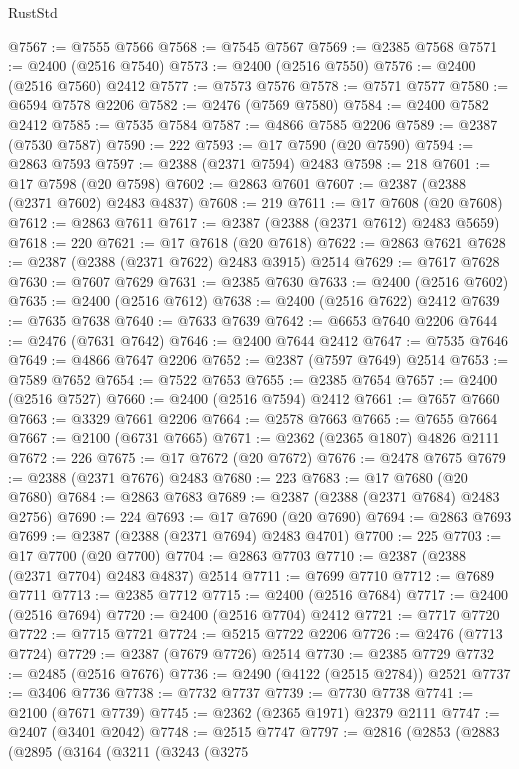 \begin{lexlean}{RustStd}
\begin{coremodule}
@7567 := @7555 @7566
@7568 := @7545 @7567
@7569 := @2385 @7568
@7571 := @2400 (@2516 @7540)
@7573 := @2400 (@2516 @7550)
@7576 := @2400 (@2516 @7560) @2412
@7577 := @7573 @7576
@7578 := @7571 @7577
@7580 := @6594 @7578 @2206
@7582 := @2476 (@7569 @7580)
@7584 := @2400 @7582 @2412
@7585 := @7535 @7584
@7587 := @4866 @7585 @2206
@7589 := @2387 (@7530 @7587)
@7590 := 222
@7593 := @17 @7590 (@20 @7590)
@7594 := @2863 @7593
@7597 := @2388 (@2371 @7594) @2483
@7598 := 218
@7601 := @17 @7598 (@20 @7598)
@7602 := @2863 @7601
@7607 := @2387 (@2388 (@2371 @7602) @2483 @4837)
@7608 := 219
@7611 := @17 @7608 (@20 @7608)
@7612 := @2863 @7611
@7617 := @2387 (@2388 (@2371 @7612) @2483 @5659)
@7618 := 220
@7621 := @17 @7618 (@20 @7618)
@7622 := @2863 @7621
@7628 := @2387 (@2388 (@2371 @7622) @2483 @3915) @2514
@7629 := @7617 @7628
@7630 := @7607 @7629
@7631 := @2385 @7630
@7633 := @2400 (@2516 @7602)
@7635 := @2400 (@2516 @7612)
@7638 := @2400 (@2516 @7622) @2412
@7639 := @7635 @7638
@7640 := @7633 @7639
@7642 := @6653 @7640 @2206
@7644 := @2476 (@7631 @7642)
@7646 := @2400 @7644 @2412
@7647 := @7535 @7646
@7649 := @4866 @7647 @2206
@7652 := @2387 (@7597 @7649) @2514
@7653 := @7589 @7652
@7654 := @7522 @7653
@7655 := @2385 @7654
@7657 := @2400 (@2516 @7527)
@7660 := @2400 (@2516 @7594) @2412
@7661 := @7657 @7660
@7663 := @3329 @7661 @2206
@7664 := @2578 @7663
@7665 := @7655 @7664
@7667 := @2100 (@6731 @7665)
@7671 := @2362 (@2365 @1807) @4826 @2111
@7672 := 226
@7675 := @17 @7672 (@20 @7672)
@7676 := @2478 @7675
@7679 := @2388 (@2371 @7676) @2483
@7680 := 223
@7683 := @17 @7680 (@20 @7680)
@7684 := @2863 @7683
@7689 := @2387 (@2388 (@2371 @7684) @2483 @2756)
@7690 := 224
@7693 := @17 @7690 (@20 @7690)
@7694 := @2863 @7693
@7699 := @2387 (@2388 (@2371 @7694) @2483 @4701)
@7700 := 225
@7703 := @17 @7700 (@20 @7700)
@7704 := @2863 @7703
@7710 := @2387 (@2388 (@2371 @7704) @2483 @4837) @2514
@7711 := @7699 @7710
@7712 := @7689 @7711
@7713 := @2385 @7712
@7715 := @2400 (@2516 @7684)
@7717 := @2400 (@2516 @7694)
@7720 := @2400 (@2516 @7704) @2412
@7721 := @7717 @7720
@7722 := @7715 @7721
@7724 := @5215 @7722 @2206
@7726 := @2476 (@7713 @7724)
@7729 := @2387 (@7679 @7726) @2514
@7730 := @2385 @7729
@7732 := @2485 (@2516 @7676)
@7736 := @2490 (@4122 (@2515 @2784)) @2521
@7737 := @3406 @7736
@7738 := @7732 @7737
@7739 := @7730 @7738
@7741 := @2100 (@7671 @7739)
@7745 := @2362 (@2365 @1971) @2379 @2111
@7747 := @2407 (@3401 @2042)
@7748 := @2515 @7747
@7797 := @2816
    (@2853
      (@2883
        (@2895
          (@3164
            (@3211
              (@3243
                (@3275

\end{coremodule}
\end{lexlean}
